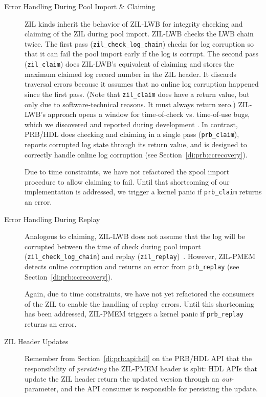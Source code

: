 \documentclass[12pt,a4paper,twoside]{book}
\begin{document}
{\begin{description}
    \item[Error Handling During Pool Import \& Claiming]
        ZIL kinds inherit the behavior of ZIL-LWB for integrity checking and claiming of the ZIL during pool import.
        ZIL-LWB checks the LWB chain twice.
        The first pass (\lstinline{zil_check_log_chain}) checks for log corruption so that it can fail the pool import early if the log is corrupt.
        The second pass (\lstinline{zil_claim}) does ZIL-LWB's equivalent of claiming and stores the maximum claimed log record number in the ZIL header.
        It discards traversal errors because it assumes that no online log corruption happened since the first pass.
        (Note that \lstinline{zil_claim} does have a return value, but only due to software-technical reasons. It must always return zero.)
        ZIL-LWB's approach opens a window for time-of-check vs. time-of-use bugs, which we discovered and reported during development \cite{OpenZFSGithubIssueHandlingOfLostClaimedNotReplayedLogRecords}.
        In contrast, PRB/HDL does checking and claiming in a single pass (\lstinline{prb_claim}), reports corrupted log state through its return value, and is designed to correctly handle online log corruption (see Section~\ref{di:prb:ccrecovery}).

        Due to time constraints, we have not refactored the zpool import procedure to allow claiming to fail.
        Until that shortcoming of our implementation is addressed, we trigger a kernel panic if \lstinline{prb_claim} returns an error.

    \item[Error Handling During Replay]
        Analogous to claiming, ZIL-LWB does not assume that the log will be corrupted between the time of check during pool import (\lstinline{zil_check_log_chain}) and replay (\lstinline{zil_replay})~\cite{OpenZFSGithubIssueFailingDebugAssertionWhenLosingClaimedNotReplayedLWBs}.
        However, ZIL-PMEM detects online corruption and returns an error from \lstinline{prb_replay} (see Section~\ref{di:prb:ccrecovery}).

        Again, due to time constraints, we have not yet refactored the consumers of the ZIL to enable the handling of replay errors.
        Until this shortcoming has been addressed, ZIL-PMEM triggers a kernel panic if \lstinline{prb_replay} returns an error.

    \item[ZIL Header Updates]
        Remember from Section~\ref{di:prb:api:hdl} on the PRB/HDL API that the responsibility of \textit{persisting} the ZIL-PMEM header is split:
        HDL APIs that update the ZIL header return the updated version through an \textit{out}-parameter, and the API consumer is responsible for persisting the update.


\end{description}}
\end{document}
